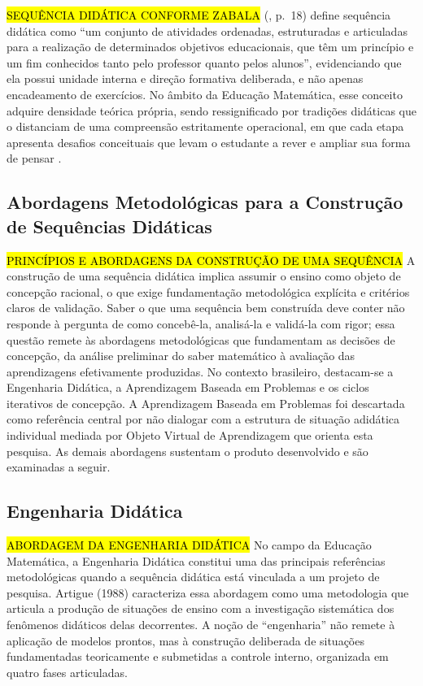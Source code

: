 {\hl{SEQUÊNCIA DIDÁTICA CONFORME ZABALA} \citeauthor{zabala1998} (\citeyear{zabala1998}, p.~18) define sequência didática como ``um conjunto de atividades ordenadas, estruturadas e articuladas para a realização de determinados objetivos educacionais, que têm um princípio e um fim conhecidos tanto pelo professor quanto pelos alunos'', evidenciando que ela possui unidade interna e direção formativa deliberada, e não apenas encadeamento de exercícios. No âmbito da Educação Matemática, esse conceito adquire densidade teórica própria, sendo ressignificado por tradições didáticas que o distanciam de uma compreensão estritamente operacional, em que cada etapa apresenta desafios conceituais que levam o estudante a rever e ampliar sua forma de pensar \cite[p.~66, 88]{brousseau2002}.

\subsection{Abordagens Metodológicas para a Construção de Sequências Didáticas}

\hl {PRINCÍPIOS E ABORDAGENS DA CONSTRUÇÃO DE UMA SEQUÊNCIA} A construção de uma sequência didática implica assumir o ensino como objeto de concepção racional, o que exige fundamentação metodológica explícita e critérios claros de validação. Saber o que uma sequência bem construída deve conter não responde à pergunta de como concebê-la, analisá-la e validá-la com rigor; essa questão remete às abordagens metodológicas que fundamentam as decisões de concepção, da análise preliminar do saber matemático à avaliação das aprendizagens efetivamente produzidas. No contexto brasileiro, destacam-se a Engenharia Didática, a Aprendizagem Baseada em Problemas e os ciclos iterativos de concepção. A Aprendizagem Baseada em Problemas \cite{viana2020abp} foi descartada como referência central por não dialogar com a estrutura de situação adidática individual mediada por Objeto Virtual de Aprendizagem que orienta esta pesquisa. As demais abordagens sustentam o produto desenvolvido e são examinadas a seguir.

\subsection{Engenharia Didática}

\hl {ABORDAGEM DA ENGENHARIA DIDÁTICA} No campo da Educação Matemática, a Engenharia Didática constitui uma das principais referências metodológicas quando a sequência didática está vinculada a um projeto de pesquisa. Artigue (1988) caracteriza essa abordagem como uma metodologia que articula a produção de situações de ensino com a investigação sistemática dos fenômenos didáticos delas decorrentes. A noção de ``engenharia'' não remete à aplicação de modelos prontos, mas à construção deliberada de situações fundamentadas teoricamente e submetidas a controle interno, organizada em quatro fases articuladas.

}
